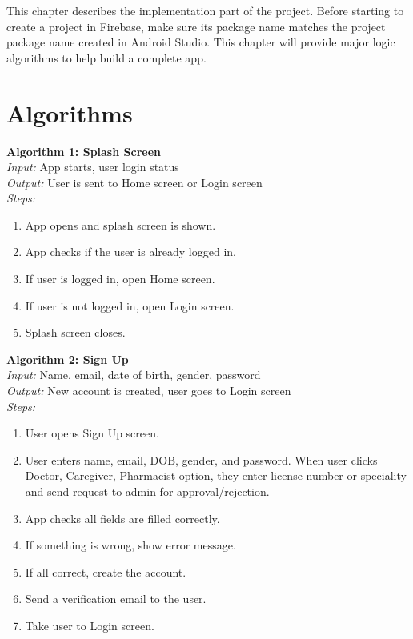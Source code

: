 \documentclass[12pt, a4paper, oneside]{report}
\begin{document}
This chapter describes the implementation part of the project. Before starting to create a project in Firebase, make sure its package name matches the project package name created in Android Studio. This chapter will provide major logic algorithms to help build a complete app.

\section{Algorithms}


\textbf{Algorithm 1: Splash Screen}\\
\textit{Input:} App starts, user login status\\
\textit{Output:} User is sent to Home screen or Login screen\\
\textit{Steps:}
\begin{enumerate}
    \item App opens and splash screen is shown.
    \item App checks if the user is already logged in.
    \item If user is logged in, open Home screen.
    \item If user is not logged in, open Login screen.
    \item Splash screen closes.
\end{enumerate}

\textbf{Algorithm 2: Sign Up}\\
\textit{Input:} Name, email, date of birth, gender, password\\
\textit{Output:} New account is created, user goes to Login screen\\
\textit{Steps:}
\begin{enumerate}
    \item User opens Sign Up screen.
    \item User enters name, email, DOB, gender, and password. When user clicks Doctor, Caregiver, Pharmacist option, they enter license number or speciality and send request to admin for approval/rejection.
    \item App checks all fields are filled correctly.
    \item If something is wrong, show error message.
    \item If all correct, create the account.
    \item Send a verification email to the user.
    \item Take user to Login screen.
\end{enumerate}
\end{document}
